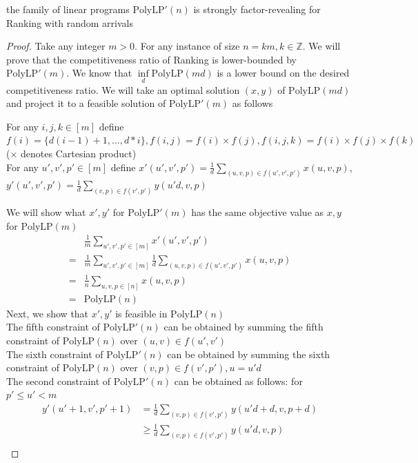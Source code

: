 \begin{lemma}
	\label{ra-rank-strong-rev}
	the family of linear programs $\mathrm{PolyLP'}(n)$ is strongly factor-revealing for Ranking with random arrivals
\end{lemma}
\begin{proof}
Take any integer $m>0$. For any instance of size $n=km,k\in\mathbb{Z}$. We will prove that the competitiveness ratio of Ranking is lower-bounded by $\mathrm{PolyLP'}(m)$. We know that $\inf\limits_d\mathrm{PolyLP}(md)$ is a lower bound on the desired competitiveness ratio. We will take an optimal solution $(x,y)$ of $\mathrm{PolyLP}(md)$ and project it to a feasible solution of $\mathrm{PolyLP'}(m)$ as follows
	\begin{definition}
		For any $i,j,k\in[m]$ define $f(i)=\{d(i-1)+1,\dots,d * i\}, f(i,j)=f(i)\times f(j), f(i,j,k)=f(i)\times f(j)\times f(k)$ ($\times$ denotes Cartesian product)\\
		For any $u',v',p'\in[m]$ define $x'(u',v',p')=\frac{1}{d}\sum\limits_{(u,v,p)\in f(u',v',p')}x(u,v,p)$,$y'(u',v',p')\allowbreak=\frac{1}{d}\sum\limits_{(v,p)\in f(v',p')}y(u'd,v,p)$
	\end{definition}
	We will show what $x',y'$ for $\mathrm{PolyLP'}(m)$ has the same objective value as $x,y$ for $\mathrm{PolyLP}(m)$
	\begin{align*}
		 &\frac{1}{m}\sum\limits_{u',v',p'\in[m]}x'(u',v',p')\\
		=&\frac{1}{m}\sum\limits_{u',v',p'\in[m]}\frac{1}{d}\sum\limits_{(u,v,p)\in f(u',v',p')}x(u,v,p)\\
		=&\frac{1}{n}\sum\limits_{u,v,p\in[n]}x(u,v,p)\\
		=&\mathrm{PolyLP}(n)
	\end{align*}
	Next, we show that $x',y'$ is feasible in $\mathrm{PolyLP}(n)$\\
	The fifth constraint of $\mathrm{PolyLP'}(n)$ can be obtained by summing the fifth constraint of $\mathrm{PolyLP}(n)$ over $(u,v)\in f(u',v')$\\
	The sixth constraint of $\mathrm{PolyLP'}(n)$ can be obtained by summing the sixth constraint of $\mathrm{PolyLP}(n)$ over $(v,p)\in f(v',p'),u=u'd$\\
	The second constraint of $\mathrm{PolyLP'}(n)$ can be obtained as follows: for $p'\leq u' < m$
	\begin{align*}
		y'(u'+1,v',p'+1) &=\frac{1}{d}\sum\limits_{(v,p)\in f(v',p')}y(u'd+d,v,p+d)\\ 
		                 &\geq \frac{1}{d}\sum\limits_{(v,p)\in f(v',p')} y(u'd,v,p)\\

\end{align*}
\end{proof}
